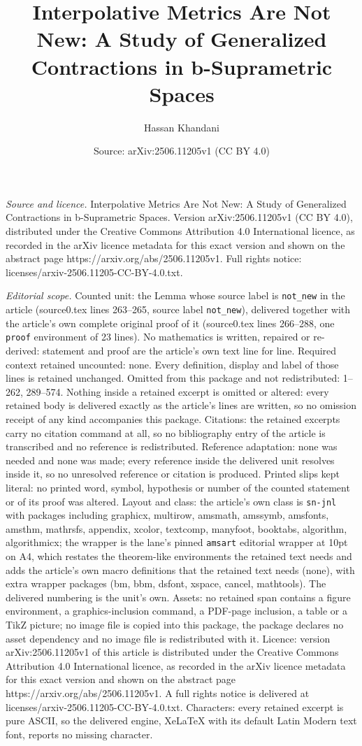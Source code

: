 \documentclass[10pt,a4paper]{amsart}
\title[Interpolative Metrics Are Not New: A Study of Generalized Co]{Interpolative Metrics Are Not New: A Study of Generalized Contractions in b-Suprametric Spaces}
\author{Hassan Khandani}
\date{Source: arXiv:2506.11205v1 (CC BY 4.0)}
\begin{document}
\maketitle

\noindent\emph{Source and licence.} Interpolative Metrics Are Not New: A Study of Generalized Contractions in b-Suprametric Spaces. Version arXiv:2506.11205v1 (CC BY 4.0), distributed under the Creative Commons Attribution 4.0 International licence, as recorded in the arXiv licence metadata for this exact version and shown on the abstract page https://arxiv.org/abs/2506.11205v1. Full rights notice: licenses/arxiv-2506.11205-CC-BY-4.0.txt.\par\smallskip

\noindent\textit{Editorial scope.} Counted unit: the Lemma whose source label is \texttt{not\_new} in the article (source0.tex lines 263--265, source label \texttt{not\_new}), delivered together with the article's own complete original proof of it (source0.tex lines 266--288, one \texttt{proof} environment of 23 lines). No mathematics is written, repaired or re-derived: statement and proof are the article's own text line for line. Required context retained uncounted: none. Every definition, display and label of those lines is retained unchanged. Omitted from this package and not redistributed: 1--262, 289--574. Nothing inside a retained excerpt is omitted or altered: every retained body is delivered exactly as the article's lines are written, so no omission receipt of any kind accompanies this package. Citations: the retained excerpts carry no citation command at all, so no bibliography entry of the article is transcribed and no reference is redistributed. Reference adaptation: none was needed and none was made; every reference inside the delivered unit resolves inside it, so no unresolved reference or citation is produced. Printed slips kept literal: no printed word, symbol, hypothesis or number of the counted statement or of its proof was altered. Layout and class: the article's own class is \texttt{sn-jnl} with packages including graphicx, multirow, amsmath, amssymb, amsfonts, amsthm, mathrsfs, appendix, xcolor, textcomp, manyfoot, booktabs, algorithm, algorithmicx; the wrapper is the lane's pinned \texttt{amsart} editorial wrapper at 10pt on A4, which restates the theorem-like environments the retained text needs and adds the article's own macro definitions that the retained text needs (none), with extra wrapper packages (bm, bbm, dsfont, xspace, cancel, mathtools). The delivered numbering is the unit's own. Assets: no retained span contains a figure environment, a graphics-inclusion command, a PDF-page inclusion, a table or a TikZ picture; no image file is copied into this package, the package declares no asset dependency and no image file is redistributed with it. Licence: version arXiv:2506.11205v1 of this article is distributed under the Creative Commons Attribution 4.0 International licence, as recorded in the arXiv licence metadata for this exact version and shown on the abstract page https://arxiv.org/abs/2506.11205v1. A full rights notice is delivered at licenses/arxiv-2506.11205-CC-BY-4.0.txt. Characters: every retained excerpt is pure ASCII, so the delivered engine, XeLaTeX with its default Latin Modern text font, reports no missing character.
\end{document}
